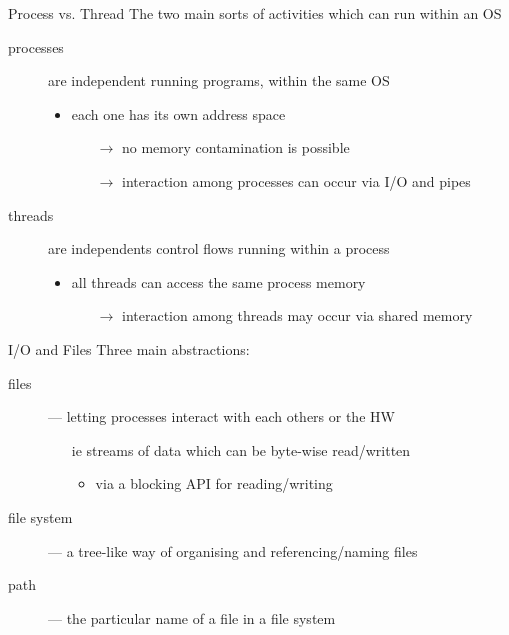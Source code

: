 \documentclass[presentation]{beamer}\mode<presentation>{\usetheme{AMSBolognaFC}}
\begin{document}
\begin{frame}[allowframebreaks]
    \begin{block}{Process vs. Thread}
        The two main sorts of activities which can run within an OS
        \begin{description}
            \item[processes] are independent running programs, within the same OS
            \begin{itemize}
                \item each one has its own address space
                \begin{itemize}
                    \item[$\rightarrow$] no memory contamination is possible
                    \item[$\rightarrow$] interaction among processes can occur via I/O and pipes
                \end{itemize}
            \end{itemize}

            \item[threads] are independents control flows running within a process
            \begin{itemize}
                \item all threads can access the same process memory
                \begin{itemize}
                    \item[$\rightarrow$] interaction among threads may occur via shared memory
                \end{itemize}
            \end{itemize}
        \end{description}
    \end{block}

    \begin{block}{I/O and Files}
        Three main abstractions:
        \begin{description}
            \item[files] --- letting processes interact with each others or the HW
            \begin{itemize}
                \item[ie] \alert{streams} of data which can be byte-wise \alert{read/written}
                \begin{itemize}
                    \item via a \alert{blocking} API for reading/writing
                \end{itemize}
            \end{itemize}

            \item[file system] --- a \alert{tree}-like way of organising and \alert{referencing}/naming files

            \item[path] --- the particular name of a file in a file system
        \end{description}
    \end{block}
\end{frame}
\end{document}
